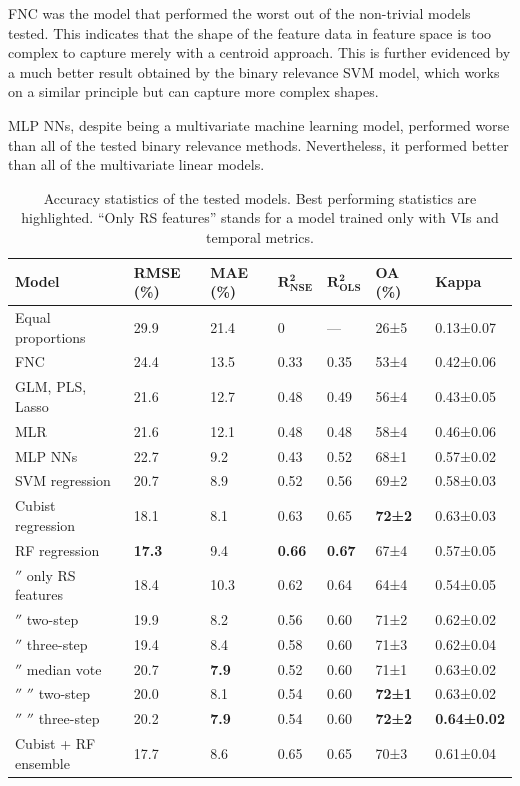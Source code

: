 \documentclass[review,authoryear,3p]{elsarticle}
\begin{document}
\Gls{FNC} was the model that performed the worst out of the non-trivial models tested.
This indicates that the shape of the feature data in feature space is too complex to capture merely with a centroid approach.
This is further evidenced by a much better result obtained by the binary relevance \gls{SVM} model, which works on a similar principle but can capture more complex shapes.

\Gls{MLP} \glspl{NN}, despite being a multivariate machine learning model, performed worse than all of the tested binary relevance methods.
Nevertheless, it performed better than all of the multivariate linear models.

\begin{table}
\centering
\begin{tabular}{lllllll}
\toprule
\textbf{Model} & \textbf{\ac{RMSE} (\%)} & \textbf{\ac{MAE} (\%)} & $\mathbf{R^2_{NSE}}$ & $\mathbf{R^2_{OLS}}$ & \textbf{\ac{OA} (\%)} & \textbf{Kappa} \\
\midrule
Equal proportions
& 29.9  & 21.4  & 0     & — & 26±5  & 0.13±0.07 \\
\Gls{FNC}
& 24.4  & 13.5  & 0.33  & 0.35 & 53±4  & 0.42±0.06 \\
\Gls{GLM}, \Gls{PLS}, Lasso
& 21.6  & 12.7  & 0.48  & 0.49 & 56±4  & 0.43±0.05 \\
\Gls{MLR}
& 21.6  & 12.1  & 0.48  & 0.48 & 58±4  & 0.46±0.06 \\
\Gls{MLP} \glspl{NN}
& 22.7  & 9.2   & 0.43  & 0.52 & 68±1  & 0.57±0.02 \\
\Gls{SVM} regression
& 20.7  & 8.9   & 0.52  & 0.56 & 69±2  & 0.58±0.03 \\
Cubist regression
& 18.1  & 8.1   & 0.63  & 0.65 & \textbf{72±2}  & 0.63±0.03 \\
\Gls{RF} regression
& \textbf{17.3}  & 9.4   & \textbf{0.66}  & \textbf{0.67} & 67±4  & 0.57±0.05 \\
\ensuremath{''}
only RS features
& 18.4  & 10.3  & 0.62  & 0.64 & 64±4  & 0.54±0.05 \\
\ensuremath{''} two-step
& 19.9  & 8.2   & 0.56  & 0.60 & 71±2  & 0.62±0.02 \\
\ensuremath{''} three-step
& 19.4  & 8.4   & 0.58  & 0.60 & 71±3  & 0.62±0.04 \\
\ensuremath{''} median vote
& 20.7  & \textbf{7.9}   & 0.52  & 0.60 & 71±1  & 0.63±0.02 \\
\ensuremath{''} \ensuremath{''} two-step
& 20.0  & 8.1   & 0.54  & 0.60 & \textbf{72±1}  & 0.63±0.02 \\
\ensuremath{''} \ensuremath{''} three-step
& 20.2  & \textbf{7.9}   & 0.54  & 0.60 & \textbf{72±2}  & \textbf{0.64±0.02} \\
Cubist + RF ensemble
& 17.7  & 8.6   & 0.65  & 0.65 & 70±3 & 0.61±0.04 \\
\bottomrule
\end{tabular}
\caption{Accuracy statistics of the tested models. Best performing statistics are highlighted. ``Only RS features'' stands for a model trained only with \glspl{VI} and temporal metrics.}
\label{tab-accuracy}
\end{table}
\end{document}
